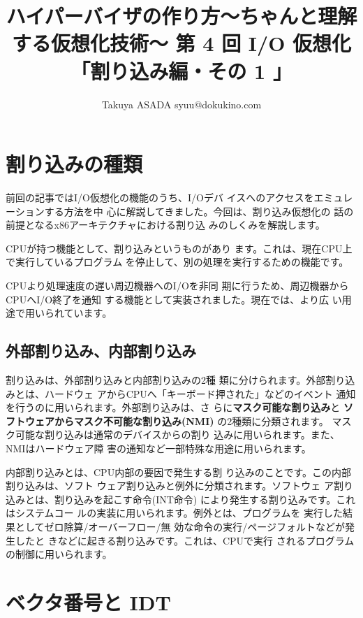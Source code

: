 
\title{ハイパーバイザの作り方～ちゃんと理解する仮想化技術～ 第 4 回 I/O 仮想化「割り込み編・その 1 」}
 \author{Takuya ASADA syuu@dokukino.com}

\maketitle

\section{割り込みの種類}

 前回の記事ではI/O仮想化の機能のうち、I/Oデバ
イスへのアクセスをエミュレーションする方法を中
心に解説してきました。今回は、割り込み仮想化の
話の前提となるx86アーキテクチャにおける割り込
みのしくみを解説します。

 CPUが持つ機能として、割り込みというものがあり
ます。これは、現在CPU上で実行しているプログラム
を停止して、別の処理を実行するための機能です。

 CPUより処理速度の遅い周辺機器へのI/Oを非同
期に行うため、周辺機器からCPUへI/O終了を通知
する機能として実装されました。現在では、より広
い用途で用いられています。

\subsection{外部割り込み、内部割り込み}

 割り込みは、外部割り込みと内部割り込みの2種
類に分けられます。外部割り込みとは、ハードウェ
アからCPUへ「キーボード押された」などのイベント
通知を行うのに用いられます。外部割り込みは、さ
らに{\bf マスク可能な割り込み}と
{\bf ソフトウェアからマスク不可能な割り込み(NMI)}
の2種類に分類されます。
マスク可能な割り込みは通常のデバイスからの割り
込みに用いられます。また、NMIはハードウェア障
害の通知など一部特殊な用途に用いられます。

 内部割り込みとは、CPU内部の要因で発生する割
り込みのことです。この内部割り込みは、ソフト
ウェア割り込みと例外に分類されます。ソフトウェ
ア割り込みとは、割り込みを起こす命令(INT命令)
により発生する割り込みです。これはシステムコー
ルの実装に用いられます。例外とは、プログラムを
実行した結果としてゼロ除算/オーバーフロー/無
効な命令の実行/ページフォルトなどが発生したと
きなどに起きる割り込みです。これは、CPUで実行
されるプログラムの制御に用いられます。


\section{ベクタ番号と IDT}

